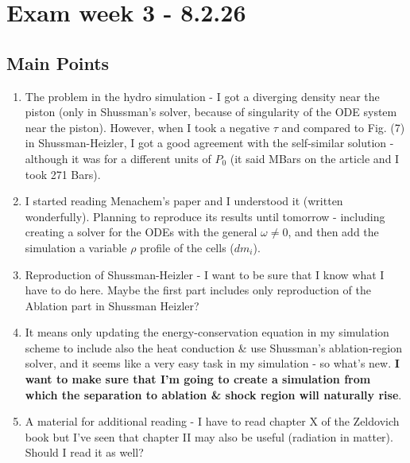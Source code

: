 \documentclass[11pt]{article}
\begin{document}
\section{Exam week 3 - 8.2.26}
\subsection{Main Points}
\begin{enumerate}
  \item The problem in the hydro simulation - I got a diverging density near the piston (only in Shussman's solver, because of singularity of the ODE system near the piston). However, when I took a negative $\tau$ and compared to Fig. (7) in Shussman-Heizler, I got a good agreement with the self-similar solution - although it was for a different units of $P_0$ (it said MBars on the article and I took 271 Bars).
  \item I started reading Menachem's paper and I understood it (written wonderfully). Planning to reproduce its results until tomorrow - including creating a solver for the ODEs with the general $\omega \neq 0$, and then add the simulation a variable $\rho$ profile of the cells ($dm_i$).
  \item Reproduction of Shussman-Heizler - I want to be sure that I know what I have to do here. 
  Maybe the first part includes only reproduction of the Ablation part in Shussman Heizler?
  \item It means only updating the energy-conservation equation in my simulation scheme to include also the heat conduction \& use Shussman's ablation-region solver, and it seems like a very easy task in my simulation - so what's new.
  \textbf{I want to make sure that I'm going to create a simulation from which the separation to ablation \& shock region will naturally rise}.
  \item A material for additional reading - I have to read chapter X of the Zeldovich book but I've seen that chapter II may also be useful (radiation in matter). Should I read it as well?
\end{enumerate}
\end{document}

